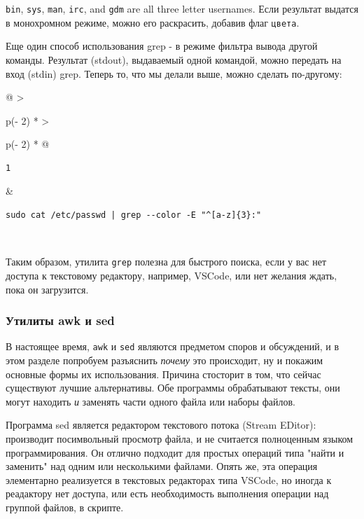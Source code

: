 \documentclass{report}
\begin{document}
\texttt{bin}, \texttt{sys}, \texttt{man}, \texttt{irc}, and \texttt{gdm}
are all three letter usernames. Если результат выдатся в монохромном
режиме, можно его раскрасить, добавив флаг \texttt{цвета}.

Еще один способ использования grep - в режиме фильтра вывода другой
команды. Результат (stdout), выдаваемый одной командой, можно передать
на вход (stdin) grep. Теперь то, что мы делали выше, можно сделать
по-другому:

\begin{longtable}[]{@{}
  >{\raggedright\arraybackslash}p{(\columnwidth - 2\tabcolsep) * }
  >{\raggedright\arraybackslash}p{(\columnwidth - 2\tabcolsep) * }@{}}
\toprule
\endhead
\begin{minipage}[t]{\linewidth}\raggedright
\begin{verbatim}
1
\end{verbatim}
\end{minipage} & \begin{minipage}[t]{\linewidth}\raggedright
\begin{verbatim}
sudo cat /etc/passwd | grep --color -E "^[a-z]{3}:"
\end{verbatim}
\end{minipage} \\ \addlinespace
\bottomrule
\end{longtable}

Таким образом, утилита \texttt{grep} полезна для быстрого поиска, если у
вас нет доступа к текстовому редактору, например, VSCode, или нет
желания ждать, пока он загрузится.

\hypertarget{awk-and-sed}{%
\subsubsection{\texorpdfstring{\protect\hyperlink{awk-and-sed}{}Утилиты
awk и sed}{Утилиты awk и sed}}\label{awk-and-sed}}

В настоящее время, \texttt{awk} и \texttt{sed} являются предметом споров
и обсуждений, и в этом разделе попробуем разъяснить \emph{почему} это
происходит, ну и покажим основные формы их использования. Причина
стосторит в том, что сейчас существуют лучшие альтернативы. Обе
программы обрабатывают тексты, они могут находить \emph{и} заменять
части одного файла или наборы файлов.

Программа sed является редактором текстового потока (Stream EDitor):
производит посимвольный просмотр файла, и не считается полноценным
языком программирования. Он отлично подходит для простых операций типа
"найти и заменить" над одним или несколькими файлами. Опять же, эта
операция элементарно реализуется в текстовых редакторах типа VSCode, но
иногда к реадактору нет доступа, или есть необходимость выполнения
операции над группой файлов, в скрипте.
\end{document}
